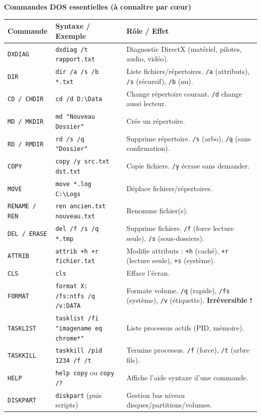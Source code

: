 \documentclass[11pt]{article}
\begin{document}
\begin{bilan}
\textbf{Commandes DOS essentielles (à connaître par cœur)}\par
\begin{center}
\begin{tabularx}{\linewidth}{|l|X|X|}\hline
\rowcolor{popblueL}
\textbf{Commande} & \textbf{Syntaxe / Exemple} & \textbf{Rôle / Effet} \\\hline
\texttt{DXDIAG} & \texttt{dxdiag /t rapport.txt} & Diagnostic DirectX (matériel, pilotes, audio, vidéo).\\\hline
\texttt{DIR} & \texttt{dir /a /s /b *.txt} & Liste fichiers/répertoires. \texttt{/a} (attributs), \texttt{/s} (récursif), \texttt{/b} (nu).\\\hline
\texttt{CD / CHDIR} & \texttt{cd /d D:\textbackslash Data} & Change répertoire courant. \texttt{/d} change aussi lecteur.\\\hline
\texttt{MD / MKDIR} & \texttt{md "Nouveau Dossier"} & Crée un répertoire.\\\hline
\texttt{RD / RMDIR} & \texttt{rd /s /q "Dossier"} & Supprime répertoire. \texttt{/s} (arbo), \texttt{/q} (sans confirmation).\\\hline
\texttt{COPY} & \texttt{copy /y src.txt dst.txt} & Copie fichiers. \texttt{/y} écrase sans demander.\\\hline
\texttt{MOVE} & \texttt{move *.log C:\textbackslash Logs} & Déplace fichiers/répertoires.\\\hline
\texttt{RENAME / REN} & \texttt{ren ancien.txt nouveau.txt} & Renomme fichier(s).\\\hline
\texttt{DEL / ERASE} & \texttt{del /f /s /q *.tmp} & Supprime fichiers. \texttt{/f} (force lecture seule), \texttt{/s} (sous-dossiers).\\\hline
\texttt{ATTRIB} & \texttt{attrib +h +r fichier.txt} & Modifie attributs : \texttt{+h} (caché), \texttt{+r} (lecture seule), \texttt{+s} (système).\\\hline
\texttt{CLS} & \texttt{cls} & Efface l'écran.\\\hline
\texttt{FORMAT} & \texttt{format X: /fs:ntfs /q /v:DATA} & Formate volume. \texttt{/q} (rapide), \texttt{/fs} (système), \texttt{/v} (étiquette). \textbf{Irréversible !}\\\hline
\texttt{TASKLIST} & \texttt{tasklist /fi "imagename eq chrome*"} & Liste processus actifs (PID, mémoire).\\\hline
\texttt{TASKKILL} & \texttt{taskkill /pid 1234 /f /t} & Termine processus. \texttt{/f} (force), \texttt{/t} (arbre fils).\\\hline
\texttt{HELP} & \texttt{help copy} ou \texttt{copy /?} & Affiche l'aide syntaxe d'une commande.\\\hline
\texttt{DISKPART} & \texttt{diskpart} (puis scripts) & Gestion bas niveau disques/partitions/volumes.\\\hline
\end{tabularx}
\end{center}


\end{bilan}
\end{document}
